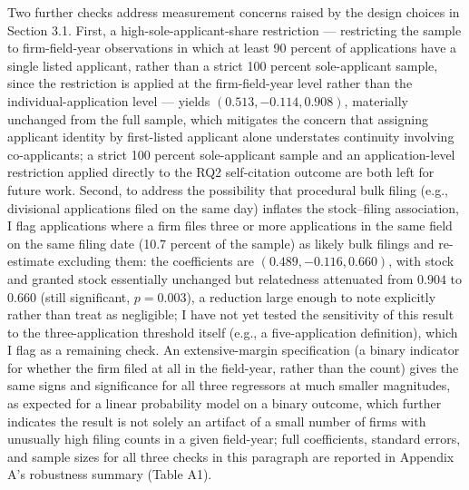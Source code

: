 \documentclass[12pt]{article}
\begin{document}
Two further checks address measurement concerns raised by the design choices in Section 3.1. First, a high-sole-applicant-share restriction --- restricting the sample to firm-field-year observations in which at least 90 percent of applications have a single listed applicant, rather than a strict 100 percent sole-applicant sample, since the restriction is applied at the firm-field-year level rather than the individual-application level --- yields $(0.513,-0.114,0.908)$, materially unchanged from the full sample, which mitigates the concern that assigning applicant identity by first-listed applicant alone understates continuity involving co-applicants; a strict 100 percent sole-applicant sample and an application-level restriction applied directly to the RQ2 self-citation outcome are both left for future work. Second, to address the possibility that procedural bulk filing (e.g., divisional applications filed on the same day) inflates the stock--filing association, I flag applications where a firm files three or more applications in the same field on the same filing date (10.7 percent of the sample) as likely bulk filings and re-estimate excluding them: the coefficients are $(0.489,-0.116,0.660)$, with stock and granted stock essentially unchanged but relatedness attenuated from $0.904$ to $0.660$ (still significant, $p=0.003$), a reduction large enough to note explicitly rather than treat as negligible; I have not yet tested the sensitivity of this result to the three-application threshold itself (e.g., a five-application definition), which I flag as a remaining check. An extensive-margin specification (a binary indicator for whether the firm filed at all in the field-year, rather than the count) gives the same signs and significance for all three regressors at much smaller magnitudes, as expected for a linear probability model on a binary outcome, which further indicates the result is not solely an artifact of a small number of firms with unusually high filing counts in a given field-year; full coefficients, standard errors, and sample sizes for all three checks in this paragraph are reported in Appendix A's robustness summary (Table A1).
\end{document}
